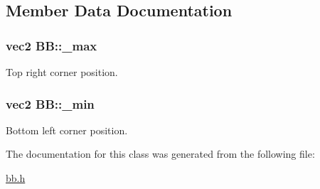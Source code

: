 \subsection{Member Data Documentation}
\hypertarget{class_b_b_af3061cea04192cbe6f1ff43cea019a2d}{
\subsubsection[{\+\_\+max}]{\setlength{\rightskip}{0pt plus 5cm}vec2 B\+B\+::\+\_\+max}}\label{class_b_b_af3061cea04192cbe6f1ff43cea019a2d}


Top right corner position. 

\hypertarget{class_b_b_a4b3364614ae922eefae03a902422c289}{
\subsubsection[{\+\_\+min}]{\setlength{\rightskip}{0pt plus 5cm}vec2 B\+B\+::\+\_\+min}}\label{class_b_b_a4b3364614ae922eefae03a902422c289}


Bottom left corner position. 



The documentation for this class was generated from the following file\+:\begin{DoxyCompactItemize}
\item 
\hyperlink{bb_8h}{bb.\+h}\end{DoxyCompactItemize}
